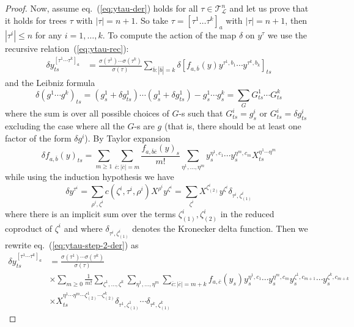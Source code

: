 \documentclass[a4paper,11pt,reqno]{article}
\newcommand{\ol}[1]{\overline{#1}}
\newcommand{\1}{{\bf 1}}
\newcommand{\der}{\delta}
\newcommand{\LL}{\mathcal{L}}
\newcommand{\TT}{\mathcal{T}}
\begin{document}
\begin{proof}
Now, assume eq.~(\ref{eq:ytau-der}) holds for all $\tau \in \TT^n_{\LL}$ and let us prove that it holds for trees $\tau$ with $|\tau|=n+1$. So take $\tau= [\tau^1 \dots \tau^k]_a$ with $|\tau|=n+1$, then $|\tau^i|\le n$ for any $i=1,\dots,k$. To compute the action of the map $\der$ on $y^\tau$ we use the recursive relation~(\ref{eq:ytau-rec}):
\begin{equation}
  \label{eq:ytau-step-2-der}
  \begin{split}
 \der y^{[\tau^1 \cdots \tau^k]_a}_{ts} & = \frac{\sigma(\tau^1)\cdots \sigma(\tau^k)}{\sigma(\tau)} \sum_{\ol b: |\ol b|=k} \der[ f_{a, \ol b}(y) y^{\tau^1,b_1} \cdots y^{\tau^k,b_k}]_{ts}  
   \end{split}
 \end{equation}
and the Leibniz formula
$$
\der (g^1 \cdots g^k)_{ts} = (g^1_s + \der g^1_{ts}) \cdots (g^1_s + \der g^1_{ts}) - g^1_s \cdots g^k_s = \sum_{G} G^1_{ts} \cdots G^k_{ts}
$$
where the sum is over all possible choices of $G$-s such that $G^i_{ts}= g^i_s$ or $G^i_{ts} = \der g^i_{ts}$ excluding the case where all the $G$-s are $g$ (that is, there should be at least one factor of the form $\der g^i$). By Taylor expansion
$$
\der f_{a, \ol b}(y)_{ts} = \sum_{m\ge 1} \sum_{\ol c: |\ol c|=m} \frac{f_{a,\ol b \ol c}(y)_s}{m!} \sum_{\eta^1,\dots,\eta^m} y^{\eta^1,c_1}_s\cdots y^{\eta^m,c_m}_s X_{ts}^{\eta^1\cdots \eta^m} 
$$
while using the induction hypothesis we have
$$
\der y^{\tau^i} = \sum_{\rho^i,\zeta^i} c(\zeta^i,\tau^i,\rho^i) X^{\rho^i} y^{\zeta^i} = \sum_{\zeta^i}  X^{\zeta^i_{(2)}} y^{\zeta^i} \delta_{\tau^i,\zeta^i_{(1)}}
$$
where there is an implicit sum over the terms $\zeta^i_{(1)},\zeta^i_{(2)}$ in the reduced coproduct of $\zeta^i$ and where $\delta_{\tau^i,\zeta^i_{(1)}}$ denotes the Kronecker delta function.
Then we rewrite eq.~(\ref{eq:ytau-step-2-der}) as
\begin{equation}
  \label{eq:ytau-step-2-2}
  \begin{split}
 \der y^{[\tau^1 \cdots \tau^k]_a}_{ts} & = \frac{\sigma(\tau^1)\cdots \sigma(\tau^k)}{\sigma(\tau)} 
\\ & \times \sum_{m\ge 0}  \frac{1}{m!} \sum_{\zeta^1,\dots,\zeta^k} \sum_{\eta^1,\dots,\eta^m}  
\sum_{\ol c: |\ol c|=m+k} f_{a,\ol c}(y_s)  y^{\eta^1,c_1}_s\cdots y^{\eta^m,c_m}_s  y^{\zeta^1,c_{m+1}}_s\cdots y^{\zeta^k,c_{m+k}}_s
\\ & \times X_{ts}^{\eta^1\cdots \eta^m\cdots \zeta^1_{(2)}\cdots \zeta^k_{(2)}} \delta_{\tau^1,\zeta^1_{(1)}} \cdots \delta_{\tau^k,\zeta^k_{(1)}}
   \end{split}

\end{equation}
\end{proof}
\end{document}
